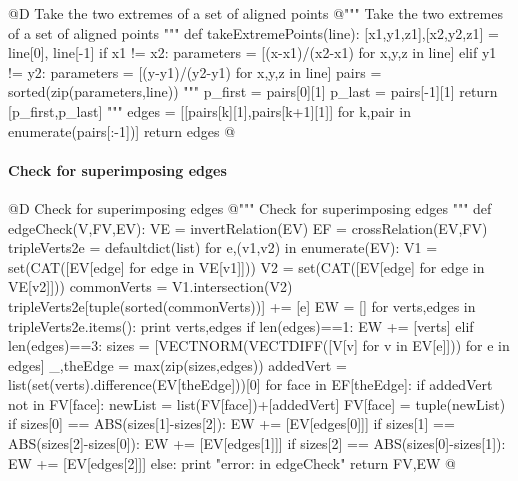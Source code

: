 \documentclass[11pt,oneside]{article}    %
\def\p#1{{\bf #1}}
\begin{document}

@D Take the two extremes of a set of aligned points
@{""" Take the two extremes of a set of aligned points """
def takeExtremePoints(line):
    [x1,y1,z1],[x2,y2,z1] = line[0], line[-1]
    if x1 != x2: parameters = [(x-x1)/(x2-x1) for x,y,z in line]
    elif y1 != y2: parameters = [(y-y1)/(y2-y1) for x,y,z in line]
    pairs = sorted(zip(parameters,line))
    """
    p_first = pairs[0][1]
    p_last = pairs[-1][1]
    return [p_first,p_last]
    """
    edges = [[pairs[k][1],pairs[k+1][1]] for k,pair in enumerate(pairs[:-1])]
    return edges
@}


\paragraph{Check for superimposing edges}
@D Check for superimposing edges
@{""" Check for superimposing edges """
def edgeCheck(V,FV,EV):
    VE = invertRelation(EV)
    EF = crossRelation(EV,FV)
    tripleVerts2e = defaultdict(list)
    for e,(v1,v2) in enumerate(EV):
        V1 = set(CAT([EV[edge] for edge in VE[v1]])) 
        V2 = set(CAT([EV[edge] for edge in VE[v2]])) 
        commonVerts = V1.intersection(V2)
        tripleVerts2e[tuple(sorted(commonVerts))] += [e]
    EW = []
    for verts,edges in tripleVerts2e.items():
        print verts,edges
        if len(edges)==1:  EW += [verts]
        elif len(edges)==3: 
            sizes = [VECTNORM(VECTDIFF([V[v] for v in EV[e]])) for e in edges]
            _,theEdge = max(zip(sizes,edges))
            addedVert = list(set(verts).difference(EV[theEdge]))[0]
            for face in EF[theEdge]:
                if addedVert not in FV[face]:  
                    newList = list(FV[face])+[addedVert]
                    FV[face] = tuple(newList)
            if sizes[0] == ABS(sizes[1]-sizes[2]): EW += [EV[edges[0]]]
            if sizes[1] == ABS(sizes[2]-sizes[0]): EW += [EV[edges[1]]]
            if sizes[2] == ABS(sizes[0]-sizes[1]): EW += [EV[edges[2]]]
        else: print "error: in edgeCheck"
    return FV,EW
@}
\end{document}
